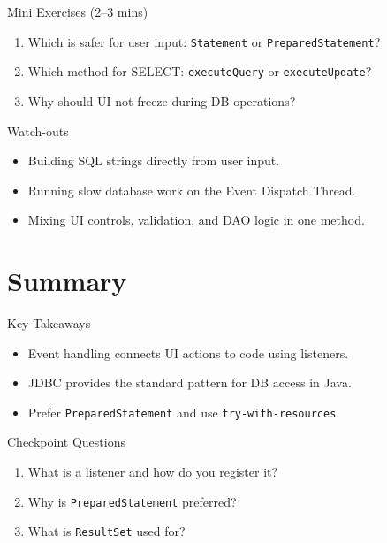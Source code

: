 \documentclass{beamer}
\begin{document}
\begin{frame}{Mini Exercises (2--3 mins)}
  \begin{enumerate}[<+->]
    \item Which is safer for user input: \texttt{Statement} or \texttt{PreparedStatement}?
    \item Which method for SELECT: \texttt{executeQuery} or \texttt{executeUpdate}?
    \item Why should UI not freeze during DB operations?
  \end{enumerate}
  \slidesources{\OOPSUnitIVSources}
\end{frame}

\begin{frame}{Watch-outs}
\begin{itemize}[<+->]
  \item Building SQL strings directly from user input.
  \item Running slow database work on the Event Dispatch Thread.
  \item Mixing UI controls, validation, and DAO logic in one method.
\end{itemize}
  \slidesources{\OOPSUnitIVSources}
\end{frame}

\section{Summary}
\label{sec:summary}

\begin{frame}{Key Takeaways}
  \begin{itemize}[<+->]
    \item Event handling connects UI actions to code using listeners.
    \item JDBC provides the standard pattern for DB access in Java.
    \item Prefer \texttt{PreparedStatement} and use \texttt{try-with-resources}.
  \end{itemize}
  \slidesources{\OOPSUnitIVSources}
\end{frame}

\begin{frame}{Checkpoint Questions}
  \begin{enumerate}[<+->]
    \item What is a listener and how do you register it?
    \item Why is \texttt{PreparedStatement} preferred?
    \item What is \texttt{ResultSet} used for?
  \end{enumerate}
  \slidesources{\OOPSUnitIVSources}
\end{frame}
\end{document}
